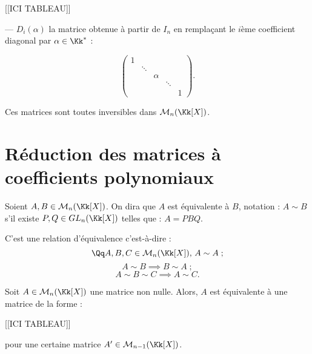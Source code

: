 \documentclass[class=report,crop=false]{standalone}
\newcommand{\GL}{GL}
\begin{document}
[[ICI TABLEAU]]


--- $D_i(\alpha)$ \og la matrice obtenue à partir de $I_n$ en rempla\c{c}ant le $i$ème coefficient diagonal par $\alpha \in \Kk^*$ :

\[\left(\begin{array}{ccccc}
1 &&&&\\
&\ddots &&&\\
&&\alpha &&\\
&&&\ddots &\\
&&&&1
\end{array}\right).\]

\begin{remarque*}
Ces matrices sont toutes inversibles dans $\mathcal{M}_n(\Kk[X])$.
\end{remarque*}

\section{Réduction des matrices à coefficients polynomiaux}

\begin{definition}
Soient $A,B \in \mathcal{M}_n(\Kk[X])$. On dira que $A$ est équivalente à $B$, notation : $A \sim B$ s'il existe $P,Q \in \GL_n(\Kk[X])$ telles que : $A = PBQ$.
\end{definition}

\begin{exercicecours}
C'est une relation d'équivalence c'est-à-dire :
\[\Qq A,B,C \in \mathcal{M}_n(\Kk[X]),\, A \sim A\;;\]
\[ A \sim B \implies B \sim A\;;\]
\[ A\sim B \sim C \implies A\sim C.\]
\end{exercicecours}

\begin{lemme}\label{lem:divelem}
Soit $A\in \mathcal{M}_n(\Kk[X])$ une matrice non nulle. Alors, $A$ est équivalente à une matrice de la forme :

[[ICI TABLEAU]]


pour une certaine matrice $A'\in\mathcal{M}_{n-1}(\Kk[X])$.
\end{lemme}
\end{document}
